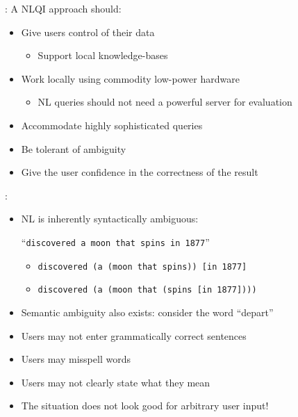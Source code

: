 \documentclass[logoontitle,tabu,supertabular,aspectratio=43]{preney-uwindsor-beamer}
\begin{document}
    \begin{frame}{\insertsection: \insertsubsection}
        A NLQI approach should:
        \begin{itemize}
            \item Give users control of their data
            \begin{itemize}
                \item Support local knowledge-bases
            \end{itemize}
            \item Work locally using commodity low-power hardware
            \begin{itemize}
                \item NL queries should not need a powerful server for evaluation
            \end{itemize}
            \item Accommodate highly sophisticated queries
            \item Be tolerant of ambiguity
            \item Give the user confidence in the correctness of the result
        \end{itemize}
    \end{frame}

    \begin{frame}{\insertsection: \insertsubsection}
        \begin{itemize}
            \item NL is inherently syntactically ambiguous:
            \vspace{0.3em}

            {\hspace{4em} ``\texttt{discovered a moon that spins in 1877}''}
            \begin{itemize}
                \item \texttt{discovered (a (moon that spins)) [in 1877]}
                \item \texttt{discovered (a (moon that (spins [in 1877])))}
            \end{itemize}
            \item Semantic ambiguity also exists: consider the word ``depart''
            \item Users may not enter grammatically correct sentences
            \item Users may misspell words
            \item Users may not clearly state what they mean
            \item The situation does not look good for arbitrary user input!
        \end{itemize}
    \end{frame}
\end{document}
